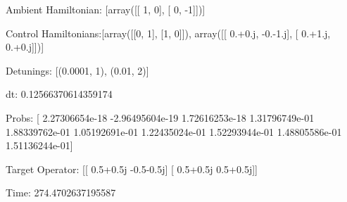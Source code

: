 \documentclass{article}
\begin{document}
    

\newpage

Ambient Hamiltonian: [array([[ 1,  0],
       [ 0, -1]])]

Control Hamiltonians:[array([[0, 1],
       [1, 0]]), array([[ 0.+0.j, -0.-1.j],
       [ 0.+1.j,  0.+0.j]])]

Detunings: [(0.0001, 1), (0.01, 2)]

 dt: 0.12566370614359174

Probs: [  2.27306654e-18  -2.96495604e-19   1.72616253e-18   1.31796749e-01
   1.88339762e-01   1.05192691e-01   1.22435024e-01   1.52293944e-01
   1.48805586e-01   1.51136244e-01]

Target Operator: [[ 0.5+0.5j -0.5-0.5j]
 [ 0.5+0.5j  0.5+0.5j]]

Time: 274.4702637195587
\end{document}
